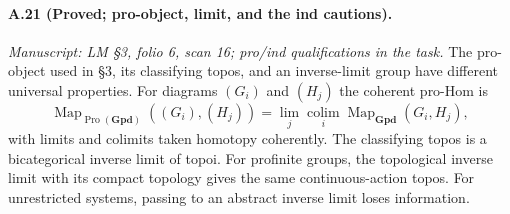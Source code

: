 \paragraph{A.21 (Proved; pro-object, limit, and the ind cautions).}
\textit{Manuscript: LM \S3, folio 6, scan 16; pro/ind qualifications in the task.}
The pro-object used in \S3, its classifying topos, and an inverse-limit group have different universal properties. For diagrams $(G_i)$ and $(H_j)$ the coherent pro-Hom is
\[
 \operatorname{Map}_{\operatorname{Pro}(\mathbf{Gpd})}
             ((G_i),(H_j))
       =\lim_j\operatorname*{colim}_i
                         \operatorname{Map}_{\mathbf{Gpd}}(G_i,H_j),
                                                        \tag{A.21.1}
\]
with limits and colimits taken homotopy coherently. The classifying topos is a bicategorical inverse limit of topoi. For profinite groups, the topological inverse limit with its compact topology gives the same continuous-action topos. For unrestricted systems, passing to an abstract inverse limit loses information.
